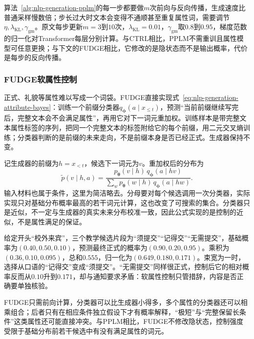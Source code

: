 算法~\ref{alg:nlp-generation-pplm}的每一步都要做$m$次前向与反向传播，生成速度比普通采样慢数倍；步长过大时文本会变得不通顺甚至重复属性词，需要调节$\eta,\lambda_{\mathrm{KL}},\gamma_{\mathrm{gm}}$。原文每步更新$m=3$到$10$次，$\lambda_{\mathrm{KL}}=0.01$，$\gamma_{\mathrm{gm}}$取$0.8$到$0.95$，梯度范数的归一化对Transformer每层分别计算。与CTRL相比，PPLM不需重训且属性模型可任意更换；与下文的FUDGE相比，它修改的是隐状态而不是输出概率，代价是每步的反向传播。

\subsubsection{FUDGE软属性控制}
\label{sec:nlp-generation-fudge}

正式、礼貌等属性难以写成一个词袋。FUDGE直接实现式~\eqref{eq:nlp-generation-attribute-bayes}：训练一个前缀分类器$q_{\bm\phi}(a\mid x_{\le t})$，预测“当前前缀继续写完后，完整文本会不会满足属性”，再用它对下一词元重加权。训练样本是带完整文本属性标签的序列，把同一个完整文本的标签附给它的每个前缀，用二元交叉熵训练；分类器判断的是前缀的未来走向，不是前缀本身是否已经正式。生成器保持不变。

记生成器的前缀为$h=x_{<t}$，候选下一词元为$v$。重加权后的分布为
\begin{equation}
  \widetilde p(v\mid h,a)=
  \frac{p_{\bm{\theta}}(v\mid h)\,q_{\bm{\phi}}(a\mid hv)}
  {\sum_w p_{\bm{\theta}}(w\mid h)\,q_{\bm{\phi}}(a\mid hw)}.
  \label{eq:nlp-generation-fudge}
\end{equation}
输入材料也属于条件，这里为简洁略去。分母要对每个候选调用一次分类器，实际实现只对基础分布概率最高的若干词元计算，这也改变了可搜索的集合。分类器只是近似，不一定与生成器的真实未来分布校准一致，因此公式实现的是控制的近似，不是属性满足的保证。

给定开头“校外来宾”，三个教学候选片段为“须提交”“记得交”“无需提交”，基础概率为$(0.40,0.50,0.10)$，预测最终正式的概率为$(0.90,0.20,0.95)$。乘积为$(0.36,0.10,0.095)$，总和$0.555$，归一化为$(0.649,0.180,0.171)$。束宽为一时，选择从口语的“记得交”变成“须提交”。“无需提交”同样很正式，控制后它的相对概率反而从$0.10$升到$0.171$，却与通知要求矛盾：软属性控制只管措辞，内容是否正确要单独核验。

FUDGE只需前向计算，分类器可以比生成器小得多，多个属性的分类器还可以相乘组合；后者只有在相应条件独立假设下才有概率解释，“极短”与“完整保留长条件”这类属性还可能直接冲突。与PPLM相比，FUDGE不修改隐状态，控制强度受限于基础分布前若干候选中有没有满足属性的词元。

